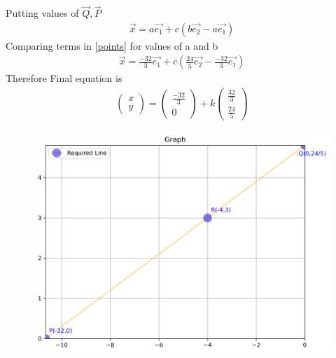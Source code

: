 \documentclass[journal]{IEEEtran}
\begin{document}
Putting values of $\vec{Q},\vec{P}$
\begin{align}
    \vec{x}=a\vec{e_1}+c(b\vec{e_2}-a\vec{e_1})
\end{align}
Comparing terms in \eqref{points} for values of a and b
\begin{align}
    \vec{x}=\frac{-32}{3}\vec{e_1}+c(\frac{24}{5}\vec{e_2}-\frac{-32}{3}\vec{e_1})
\end{align}
Therefore Final equation is
\begin{align}
\begin{pmatrix}x\\y\end{pmatrix}=\begin{pmatrix}\frac{-32}{3}\\0\end{pmatrix}+k\begin{pmatrix}\frac{32}{3}\\ \frac{24}{5}\end{pmatrix}
\end{align}
\begin{figure}[H]
    \centering
    \includegraphics[width=\columnwidth]{figs/figure.png}
    \label{fig:placeholder}
\end{figure}
\end{document}
